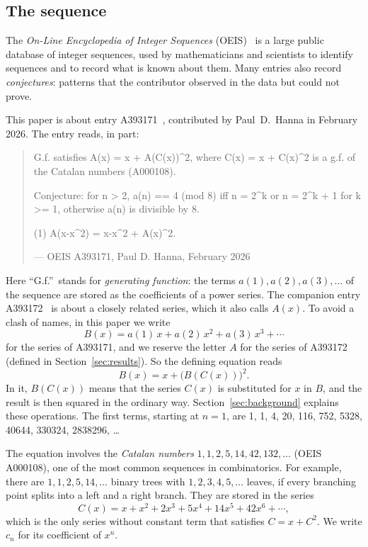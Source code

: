 \documentclass[11pt,a4paper]{article}
\theoremstyle{definition}
\theoremstyle{remark}
\begin{document}
\subsection{The sequence}\label{sec:sequence}
The \emph{On-Line Encyclopedia of Integer Sequences} (OEIS)~\cite{oeisdb} is a large public database of integer
sequences, used by mathematicians and scientists to identify sequences and to record what is known about them. Many
entries also record \emph{conjectures}: patterns that the contributor observed in the data but could not prove.

This paper is about entry A393171~\cite{oeis}, contributed by Paul~D.~Hanna in February 2026. The entry reads, in part:
\begin{quote}\small\ttfamily\raggedright G.f. satisfies A(x) = x + A(C(x))\^{}2, where C(x) = x + C(x)\^{}2 is a g.f. of the Catalan numbers (A000108).\par\smallskip Conjecture: for n > 2, a(n) == 4 (mod 8) iff n = 2\^{}k or n = 2\^{}k + 1 for k >= 1, otherwise a(n) is divisible by 8.\par\smallskip (1) A(x-x\^{}2) = x-x\^{}2 + A(x)\^{}2.\par\smallskip\hfill\textrm{--- OEIS A393171, Paul D. Hanna, February 2026}\end{quote}

Here ``G.f.''\ stands for \emph{generating function}: the terms $a(1),a(2),a(3),\dots$ of the sequence are stored as the
coefficients of a power series. The companion entry A393172~\cite{oeis172} is about a closely related series, which it
also calls $A(x)$. To avoid a clash of names, in this paper we write
\[
B(x)=a(1)\,x+a(2)\,x^2+a(3)\,x^3+\cdots
\]
for the series of A393171, and we reserve the letter $A$ for the series of A393172 (defined in
Section~\ref{sec:results}). So the defining equation reads
\[
B(x)=x+\bigl(B(C(x))\bigr)^2 .
\]
In it, $B(C(x))$ means that the series $C(x)$ is substituted for $x$ in $B$, and the result is then squared in the
ordinary way. Section~\ref{sec:background} explains these operations. The first terms, starting at $n=1$, are
1, 1, 4, 20, 116, 752, 5328, 40644, 330324, 2838296, \dots

The equation involves the \emph{Catalan numbers} $1,1,2,5,14,42,132,\dots$ (OEIS A000108), one of the most common
sequences in combinatorics. For example, there are $1,1,2,5,14,\dots$ binary trees with $1,2,3,4,5,\dots$ leaves, if
every branching point splits into a left and a right branch. They are stored in the series
\[
C(x)=x+x^2+2x^3+5x^4+14x^5+42x^6+\cdots,
\]
which is the only series without constant term that satisfies $C=x+C^2$. We write $c_n$ for its coefficient of $x^n$.
\end{document}
